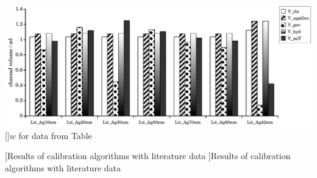 \begin{minipage}{\linewidth}
\begin{minipage}{.75\linewidth}
  \end{minipage}\\
  \begin{minipage}{.75\linewidth}
    \includegraphics[width=\linewidth]{./images/data/eval_lit_p16/Lit2Data_V_16p.pdf}
    []{$w$ for data from Table}      
  \end{minipage}
  [Results of calibration algorithms with literature data
  ]{Results of calibration algorithms with literature data}
  \label{fig:LitDataResults_p8}
\end{minipage}
{}

